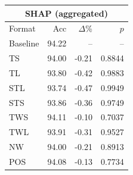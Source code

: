 \begin{tabular}{lrrr}
\toprule
\multicolumn{4}{c}{\textbf{SHAP (aggregated)}} \\
\midrule
Format & Acc & $\Delta$\% & $p$ \\
\midrule
Baseline & 94.22 & -- & -- \\
\midrule
TS & 94.00 & -0.21 & 0.8844 \\
TL & 93.80 & -0.42 & 0.9883 \\
STL & 93.74 & -0.47 & 0.9949 \\
STS & 93.86 & -0.36 & 0.9749 \\
TWS & 94.11 & -0.10 & 0.7037 \\
TWL & 93.91 & -0.31 & 0.9527 \\
NW & 94.00 & -0.21 & 0.8913 \\
POS & 94.08 & -0.13 & 0.7734 \\
\bottomrule
\end{tabular}